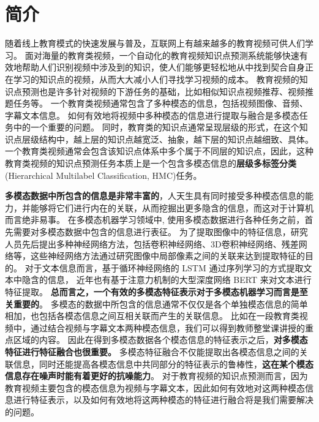 
\chapter{简介}
    随着线上教育模式的快速发展与普及，互联网上有越来越多的教育视频可供人们学习。
    面对海量的教育类视频，一个自动化的教育视频知识点预测系统能够快速有效地帮助人们识别视频中涉及到的知识，使人们能够更轻松地从中找到契合自身正在学习的知识点的视频，从而大大减小人们寻找学习视频的成本。
    教育视频的知识点预测也是许多针对视频的下游任务的基础，比如相似知识点视频推荐、视频推题任务等。
    一个教育类视频通常包含了多种模态的信息，包括视频图像、音频、字幕文本信息。
    如何有效地将视频中多种模态的信息进行提取与融合是多模态任务中的一个重要的问题。
    同时，教育类的知识点通常呈现层级的形式，在这个知识点层级结构中，越上层的知识点越宽泛、抽象，越下层的知识点越细致、具体。
    一个教育类视频通常会包含该知识点体系中多个属于不同层的知识点，因此，这种教育类视频的知识点预测任务本质上是一个包含多模态信息的\textbf{层级多标签分类}(Hierarchical Multilabel Classification, HMC)任务。

    \textbf{多模态数据中所包含的信息是非常丰富的}，人天生具有同时接受多种模态信息的能力，并能够将它们进行内在的关联，从而挖掘出更多隐含的信息，而这对于计算机而言绝非易事。
    在多模态机器学习领域中, 使用多模态数据进行各种任务之前，首先需要对多模态数据中包含的信息进行表征。
    为了提取图像中的特征信息，研究人员先后提出多种神经网络方法，包括卷积神经网络\cite{Krizhevsky2012ImageNetCW}、3D卷积神经网络\cite{Tran2015LearningSF}、残差网络\cite{He2016DeepRL}等，这些神经网络方法通过研究图像中局部像素之间的关联来达到提取特征的目的。
    对于文本信息而言，基于循环神经网络的 LSTM\cite{Hochreiter1997LongSM} 通过序列学习的方式提取文本中隐含的信息，
    近年也有基于注意力机制的大型深度网络 BERT\cite{Devlin2019BERTPO} 来对文本进行特征提取。
    \textbf{总而言之，一个有效的多模态特征表示对于多模态机器学习而言是至关重要的}\cite{Baltruaitis2019MultimodalML}。
    多模态的数据中所包含的信息通常不仅仅是各个单独模态信息的简单相加，也包括各模态信息之间互相关联而产生的关联信息。
    比如在一段教育类视频中，通过结合视频与字幕文本两种模态信息，我们可以得到教师整堂课讲授的重点区域的内容。 
    因此在得到多模态数据各个模态信息的特征表示之后，\textbf{对多模态特征进行特征融合也很重要。}
    多模态特征融合不仅能提取出各模态信息之间的关联信息，同时还能提高各模态信息中共同部分的特征表示的鲁棒性\cite{Baltruaitis2019MultimodalML}，\textbf{这在某个模态信息存在噪声时能有着更好的抗噪能力}。
    对于教育视频的知识点预测而言，因为教育视频主要包含的模态信息为视频与字幕文本，因此如何有效地对这两种模态信息进行特征表示，以及如何有效地将这两种模态的特征进行融合将是我们需要解决的问题。

